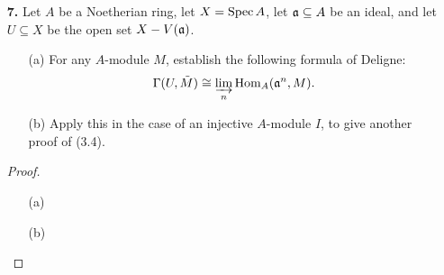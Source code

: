 \documentclass{article}
\begin{document}
\begin{enumerate} [label=\textbf{\arabic*.}, leftmargin=0em]
\begin{itemize}
  \item[(b)] Show that any injective object of $\goth{Qco}(X)$ is flasque.

  \item[(c)] Conclude that one can compute cohomology as the derived functors of $\Gamma(X, \cdot)$, considered as a functor $\goth{Qco}(X)$ to $\goth{Ab}$.
\end{itemize}

\begin{proof} $ $ \vspace{0pt}
\begin{itemize} [leftmargin=0cm]
\item[(a)] The $\Hom$ functor commutes with finite direct sums in the second argument, so we can assume $\fG = j_* \tilde{I}$, where $j : U = \spec{A} \to X$ is an open immersion, and $I$ is an injective $A$-module. Suppose $\fN \to \fM$ is an injective map of $\fO_X$-modules, and we are given any $f : \fN \to j_*\tilde{I}$. Since $j^*$ is left exact, the induced map of $A$-modules $j^* \fN \to j^* \fM$ is also injective. For any such $f$ there is an associated morphism of $A$-modules $g : j^* \fN \to \tilde{I}$ by adjointness of $j_*$, so there exists an extension of $g$ to $j^*\fM$ by injectivity of $\tilde{I}$. By adjointness of $j^*$ again, we obtain a morphism $\fM \to j_*\tilde{I}$ that naturally extends $f : \fN \to j_*\tilde{I}$, which is what we wanted to show.

\item[(b)] Let $\fI$ be an injective object of $\goth{Qco}(X)$.

\item[(c)]
\end{itemize} 
\end{proof}

\item[\textbf{7.}] Let $A$ be a Noetherian ring, let $X = \operatorname{Spec}{A}$, let $\mathfrak{a} \subseteq A$ be an ideal, and let $U \subseteq X$ be the open set $X - V(\mathfrak{a})$.
\begin{itemize}
  \item[(a)] For any $A$-module $M$, establish the following formula of Deligne:
  \begin{equation*}
    \Gamma(U, \tilde{M}) \cong \varinjlim_n{\text{Hom}_A(\mathfrak{a}^n, M)}.
  \end{equation*}
  \item[(b)] Apply this in the case of an injective $A$-module $I$, to give another proof of (3.4).
\end{itemize}

\begin{proof} $ $ \vspace{0pt}
\begin{itemize} [leftmargin=0cm]
\item[(a)]

\item[(b)]
\end{itemize} 
\end{proof}

\end{enumerate}
\end{document}

